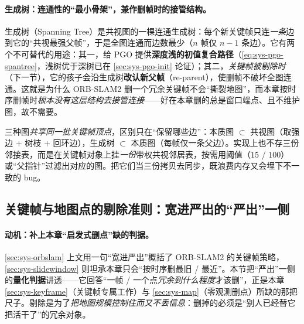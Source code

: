 \paragraph{生成树：连通性的“最小骨架”，兼作删帧时的接管结构。}
生成树（Spanning Tree）是共视图的一棵连通生成树：每个新关键帧只连\emph{一条}边到它的“共视最强父帧”，于是全图连通而边数最少（$n$ 帧仅 $n-1$ 条边）。它有两个不可替代的用途：其一，给 PGO 提供\textbf{深度浅的初值复合路径}（\cref{eq:sys-pgo-spantree}，浅树优于深树已在 \cref{sec:sys-pgo-init} 论证）；其二，\emph{关键帧被剔除时}（下一节），它的孩子会沿生成树\textbf{改认新父帧}（re-parent），使删帧不破坏全图连通。这就是为什么 ORB-SLAM2 删一个冗余关键帧不会“撕裂地图”，而本章按时序删帧时\emph{根本没有这层结构去接管连接}——好在本章删的总是窗口端点、且不维护图，故不需要。

\begin{pitfall}
三种图\emph{共享同一批关键帧顶点}，区别只在“保留哪些边”：本质图 $\subset$ 共视图（取强边 + 树枝 + 回环边），生成树 $\subset$ 本质图（每帧仅一条父边）。实现上也不存三份邻接表，而是在关键帧对象上挂\emph{一份}带权共视邻居表，按需用阈值（$15$ / $100$）或“父指针”过滤出对应的图。把它们当三份拷贝去同步，既浪费内存又会埋下不一致的 bug。
\end{pitfall}

\subsection{关键帧与地图点的剔除准则：宽进严出的“严出”一侧}
\label{sec:sys-culling}

\paragraph{动机：补上本章“启发式删点”缺的判据。}
\cref{sec:sys-orbslam} 上文用一句“宽进严出”概括了 ORB-SLAM2 的关键帧策略，\cref{sec:sys-slidewindow} 则坦承本章只会“按时序删最旧 / 最近”。本节把“严出”一侧的\textbf{量化判据}讲透——它回答“一帧 / 一个点\emph{冗余到什么程度}才该删”，正是本章 \cref{sec:sys-keyframe}（关键帧专属工作）与 \cref{sec:sys-map}（零观测删点）所缺的那把尺子。剔除是为了\emph{把地图规模控制住而又不丢信息}：删掉的必须是“别人已经替它把活干了”的冗余对象。

